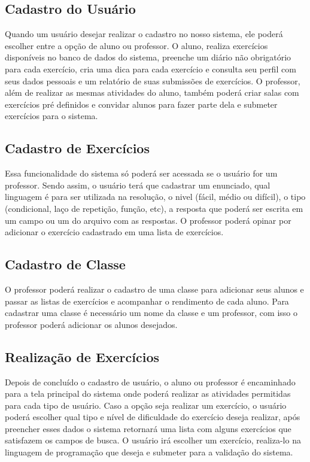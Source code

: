 \subsection{Cadastro do Usuário}

Quando um usuário desejar realizar o cadastro no nosso sistema, ele poderá escolher entre a opção de aluno ou professor. O aluno, realiza exercícios disponíveis no banco de dados do sistema, preenche um diário não obrigatório para cada exercício, cria uma dica para cada exercício e consulta seu perfil com seus dados pessoais e um relatório de suas submissões de exercícios. O professor, além de realizar as mesmas atividades do aluno, também poderá criar salas com exercícios pré definidos e convidar alunos para fazer parte dela e submeter exercícios para o sistema.

\subsection{Cadastro de Exercícios}

Essa funcionalidade do sistema só poderá ser acessada se o usuário for um professor. Sendo assim, o usuário terá que cadastrar um enunciado, qual linguagem é para ser utilizada na resolução, o nivel (fácil, médio ou difícil), o tipo (condicional, laço de repetição, função, etc), a resposta que poderá ser escrita em um campo ou um  do arquivo com as respostas. O professor poderá opinar por adicionar o exercício cadastrado em uma lista de exercícios. 

\subsection{Cadastro de Classe}

O professor poderá realizar o cadastro de uma classe para adicionar seus alunos e passar as listas de exercícios e acompanhar o rendimento de cada aluno. Para cadastrar uma classe é necessário um nome da classe e um professor, com isso o professor poderá adicionar os alunos desejados.

\subsection{Realização de Exercícios}

Depois de concluído o cadastro de usuário, o aluno ou professor é encaminhado para a tela principal do sistema onde poderá realizar as atividades permitidas para cada tipo de usuário. Caso a opção seja realizar um exercício, o usuário poderá escolher qual tipo e nível de dificuldade do exercício deseja realizar, após preencher esses dados o sistema retornará uma lista com alguns exercícios que satisfazem os campos de busca. O usuário irá escolher um exercício, realiza-lo na linguagem de programação que deseja e submeter para a validação do sistema. 

